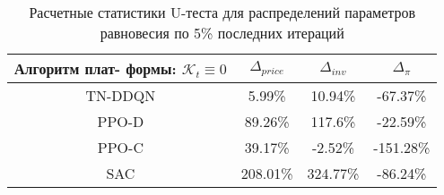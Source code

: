 \bgroup
\def\arraystretch{1.25}
\begin{table}[H]
	\caption{Расчетные статистики U-теста для распределений параметров равновесия по 5\% последних итераций}
	\label{tables:U_None}
	\begin{center}
		\vspace{-0.5em}
		\begin{tabular}{c||ccc}
			\toprule
			\makecell{Алгоритм плат-\\ формы: $\mathcal{K}_t \equiv 0$} & $\Delta_{price}$ & $\Delta_{inv}$ & $\Delta_{\pi}$ \\
			\midrule
			TN-DDQN & 5.99\% & 10.94\% & -67.37\% \\
			PPO-D & 89.26\% & 117.6\% & -22.59\% \\
			PPO-C & 39.17\% & -2.52\% & -151.28\% \\
			SAC & 208.01\% & 324.77\% & -86.24\% \\
			\bottomrule
		\end{tabular}
	\end{center}
\end{table}
\egroup